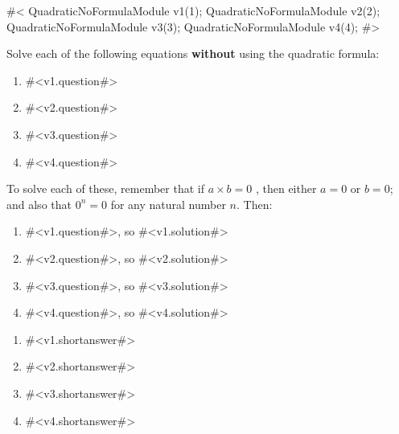 

#<
QuadraticNoFormulaModule v1(1);
QuadraticNoFormulaModule v2(2);
QuadraticNoFormulaModule v3(3);
QuadraticNoFormulaModule v4(4);
#>


Solve each of the following equations {\bf without} using the quadratic formula:
\begin{enumerate}
\item
#<v1.question#>
\item
#<v2.question#>
\item
#<v3.question#>
\item
#<v4.question#>
\end{enumerate}



To solve each of these, remember that if $a \times b=0$ , then either $a=0$ or $b=0$;  
and also that $0^{n}=0$ for any natural number $n$. Then:
\begin{enumerate}
\item
#<v1.question#>,  so
#<v1.solution#>
\item
#<v2.question#>, so
#<v2.solution#>
\item
#<v3.question#>, so
#<v3.solution#>
\item
#<v4.question#>, so
#<v4.solution#>
\end{enumerate}


\begin{enumerate}
\item
#<v1.shortanswer#>
\item
#<v2.shortanswer#>
\item
#<v3.shortanswer#>
\item
#<v4.shortanswer#>

\end{enumerate}


